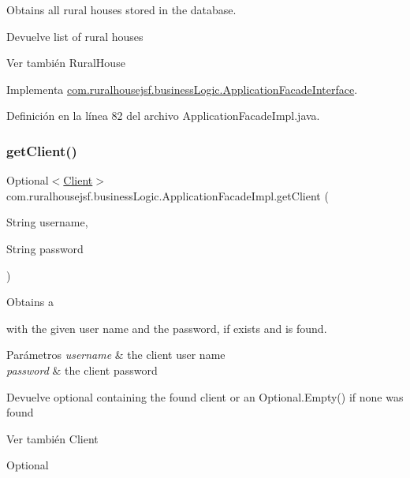 Obtains all rural houses stored in the database.

\begin{DoxyReturn}{Devuelve}
list of rural houses
\end{DoxyReturn}
\begin{DoxySeeAlso}{Ver también}
Rural\+House 
\end{DoxySeeAlso}


Implementa \mbox{\hyperlink{interfacecom_1_1ruralhousejsf_1_1business_logic_1_1_application_facade_interface_aba85657d1479d51b7bf1bd17d66d0513}{com.\+ruralhousejsf.\+business\+Logic.\+Application\+Facade\+Interface}}.



Definición en la línea 82 del archivo Application\+Facade\+Impl.\+java.

\mbox{\label{classcom_1_1ruralhousejsf_1_1business_logic_1_1_application_facade_impl_a249a902aa3507a04fb15ab5fcf1f082c}} 
\subsubsection{\texorpdfstring{getClient()}{getClient()}}
{\footnotesize\ttfamily Optional$<$\mbox{\hyperlink{classcom_1_1ruralhousejsf_1_1domain_1_1_client}{Client}}$>$ com.\+ruralhousejsf.\+business\+Logic.\+Application\+Facade\+Impl.\+get\+Client (\begin{DoxyParamCaption}\item[{String}]{username,  }\item[{String}]{password }\end{DoxyParamCaption})}

Obtains a
\begin{DoxyCode}{0}
\end{DoxyCode}
 with the given user name and the password, if exists and is found.


\begin{DoxyParams}{Parámetros}
{\em username} & the client user name \\
\hline
{\em password} & the client password\\
\hline
\end{DoxyParams}
\begin{DoxyReturn}{Devuelve}
optional containing the found client or an {\ttfamily Optional.\+Empty()} if none was found
\end{DoxyReturn}
\begin{DoxySeeAlso}{Ver también}
Client 

Optional 
\end{DoxySeeAlso}


